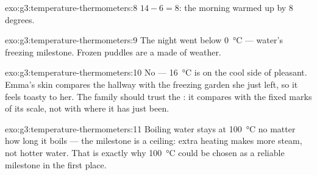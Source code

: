 \begin{solution}{exo:g3:temperature-thermometers:8}
$14 - 6 = 8$: the morning warmed up by $8$ degrees.
\end{solution}

\begin{solution}{exo:g3:temperature-thermometers:9}
The night went below \qty{0}{\celsius} --- water's freezing
milestone. Frozen puddles are a  made of weather.
\end{solution}

\begin{solution}{exo:g3:temperature-thermometers:10}
No --- \qty{16}{\celsius} is on the cool side of pleasant. Emma's
skin compares the hallway with the freezing garden she just left, so
it feels toasty to her. The family should trust the : it
compares with the fixed marks of its scale, not with where it has
just been.
\end{solution}

\begin{solution}{exo:g3:temperature-thermometers:11}
Boiling water stays at \qty{100}{\celsius} no matter how long it
boils --- the milestone is a ceiling: extra heating makes more
steam, not hotter water. That is exactly why \qty{100}{\celsius}
could be chosen as a reliable milestone in the first place.
\end{solution}
